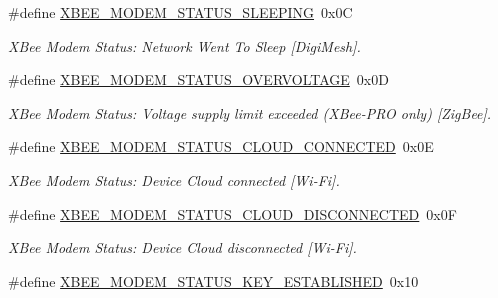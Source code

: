 \begin{DoxyCompactItemize}
\#define \hyperlink{group__xbee__device_ga1a7c823908fa0c74b692665b9a76ac99}{X\+B\+E\+E\+\_\+\+M\+O\+D\+E\+M\+\_\+\+S\+T\+A\+T\+U\+S\+\_\+\+S\+L\+E\+E\+P\+I\+NG}~0x0C
\begin{DoxyCompactList}\small\item\em X\+Bee Modem Status\+: Network Went To Sleep \mbox{[}Digi\+Mesh\mbox{]}. \end{DoxyCompactList}\item 
\mbox{\label{group__xbee__device_ga94ea3df8c78c7789b55cfa9784ee3dc4}} 
\#define \hyperlink{group__xbee__device_ga94ea3df8c78c7789b55cfa9784ee3dc4}{X\+B\+E\+E\+\_\+\+M\+O\+D\+E\+M\+\_\+\+S\+T\+A\+T\+U\+S\+\_\+\+O\+V\+E\+R\+V\+O\+L\+T\+A\+GE}~0x0D
\begin{DoxyCompactList}\small\item\em X\+Bee Modem Status\+: Voltage supply limit exceeded (X\+Bee-\/\+P\+RO only) \mbox{[}Zig\+Bee\mbox{]}. \end{DoxyCompactList}\item 
\mbox{\label{group__xbee__device_gae71297b77c0cc0dd9b75d9b27c2f781c}} 
\#define \hyperlink{group__xbee__device_gae71297b77c0cc0dd9b75d9b27c2f781c}{X\+B\+E\+E\+\_\+\+M\+O\+D\+E\+M\+\_\+\+S\+T\+A\+T\+U\+S\+\_\+\+C\+L\+O\+U\+D\+\_\+\+C\+O\+N\+N\+E\+C\+T\+ED}~0x0E
\begin{DoxyCompactList}\small\item\em X\+Bee Modem Status\+: Device Cloud connected \mbox{[}Wi-\/\+Fi\mbox{]}. \end{DoxyCompactList}\item 
\mbox{\label{group__xbee__device_ga9a85cf9201ff96546b7455758c9fd65c}} 
\#define \hyperlink{group__xbee__device_ga9a85cf9201ff96546b7455758c9fd65c}{X\+B\+E\+E\+\_\+\+M\+O\+D\+E\+M\+\_\+\+S\+T\+A\+T\+U\+S\+\_\+\+C\+L\+O\+U\+D\+\_\+\+D\+I\+S\+C\+O\+N\+N\+E\+C\+T\+ED}~0x0F
\begin{DoxyCompactList}\small\item\em X\+Bee Modem Status\+: Device Cloud disconnected \mbox{[}Wi-\/\+Fi\mbox{]}. \end{DoxyCompactList}\item 
\mbox{\label{group__xbee__device_ga190661653f541a9b694103dbd27fd284}} 
\#define \hyperlink{group__xbee__device_ga190661653f541a9b694103dbd27fd284}{X\+B\+E\+E\+\_\+\+M\+O\+D\+E\+M\+\_\+\+S\+T\+A\+T\+U\+S\+\_\+\+K\+E\+Y\+\_\+\+E\+S\+T\+A\+B\+L\+I\+S\+H\+ED}~0x10

\end{DoxyCompactItemize}
